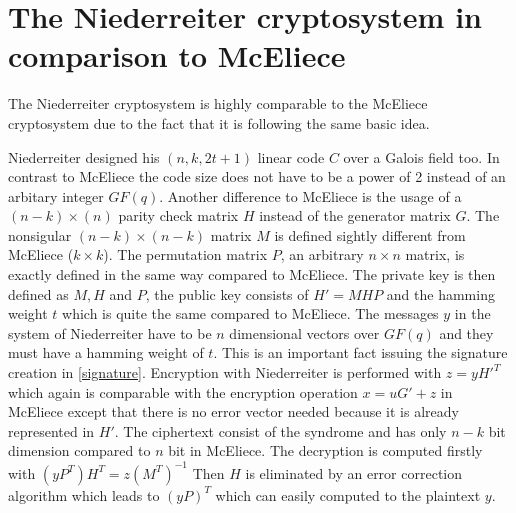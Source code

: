 \section{The Niederreiter cryptosystem in comparison to McEliece}
\label{niederreither}
The Niederreiter cryptosystem is highly comparable to the McEliece cryptosystem due to the fact that it is following the same basic idea. 

Niederreiter designed his $(n, k, 2t + 1)$ linear code $C$ over a Galois field too. In contrast to McEliece the code size does not have to be a power of 2 instead of an arbitary integer $GF(q)$. Another difference to McEliece is the usage of a $(n - k) \times (n)$ parity check matrix $H$ instead of the generator matrix $G$. The nonsigular $(n - k) \times (n - k)$ matrix $M$ is defined sightly different from McEliece ($k \times k$). The permutation matrix $P$, an arbitrary $n \times n$ matrix, is exactly defined in the same way compared to McEliece. The private key is then defined as $M, H$ and $P$, the public key consists of $H' = MHP$ and the hamming weight $t$ which is quite the same compared to McEliece.
\newline
The messages $y$ in the system of Niederreiter have to be $n$ dimensional vectors over $GF(q)$ and they must have a hamming weight of $t$. This is an important fact issuing the signature creation in \autoref{signature}.
Encryption with Niederreiter is performed with $z = yH'^T$ which again is comparable with the encryption operation $x = uG' + z$ in McEliece except that there is no error vector needed because it is already represented in $H'$. The ciphertext consist of the syndrome and has only $n - k$ bit dimension compared to $n$ bit in McEliece. 
\newline
The decryption is computed firstly with $(yP^T)H^T = z(M^T)^{-1}$ Then $H$ is eliminated by an error correction algorithm which leads to $(yP)^T$ which can easily computed to the plaintext $y$. \cite{sendrier2011niederreiter}\cite{li1994equivalence}\cite{niederreiter1986knapsack}



